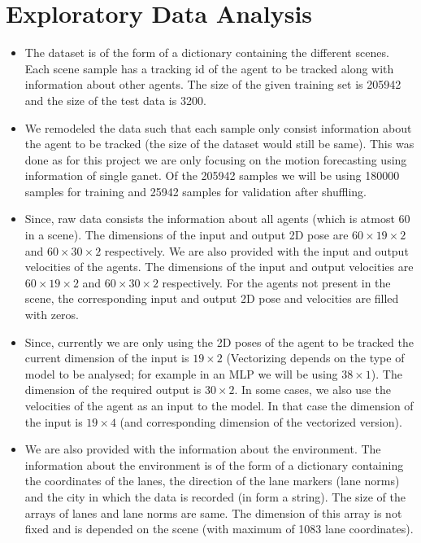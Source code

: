 \documentclass{article}
\begin{document}
\section{Exploratory Data Analysis}
\begin{itemize}
  \item The dataset is of the form of a dictionary containing the different scenes. Each scene sample has a tracking id of the agent to be tracked along with information about other agents.
  The size of the given training set is 205942 and the size of the test data is 3200. 
  \item We remodeled the data such that each sample only consist information about the agent to be tracked (the size of the dataset would still be same).
  This was done as for this project we are only focusing on the motion forecasting using information of single ganet.
  Of the 205942 samples we will be using 180000 samples for training and 25942 samples for validation after shuffling.
  \item Since, raw data consists the information about all agents (which is atmost 60 in a scene). The dimensions of the input and output 2D pose are $60 \times 19 \times 2$ and $60 \times 30 \times 2$ respectively.
  We are also provided with the input and output velocities of the agents. The dimensions of the input and output velocities are $60 \times 19 \times 2$ and $60 \times 30 \times 2$ respectively.
  For the agents not present in the scene, the corresponding input and output 2D pose and velocities are filled with zeros.
  \item Since, currently we are only using the 2D poses of the agent to be tracked the current dimension of the input is
  $19 \times 2$ (Vectorizing depends on the type of model to be analysed; for example in an MLP we will be using $38 \times 1$). The dimension of the required output is $30 \times 2$. In 
  some cases, we also use the velocities of the agent as an input to the model. In that case the dimension of the input is $19 \times 4$ (and corresponding dimension of the vectorized version).
  \item We are also provided with the information about the environment. The information about the environment is of the form of a dictionary containing the coordinates of the lanes, the direction of the lane markers (lane norms) and the city in which the data is recorded (in form a string). The size of the arrays of 
  lanes and lane norms are same. The dimension of this array is not fixed and is depended on the scene (with maximum of 1083 lane coordinates).

\end{itemize}
\end{document}
